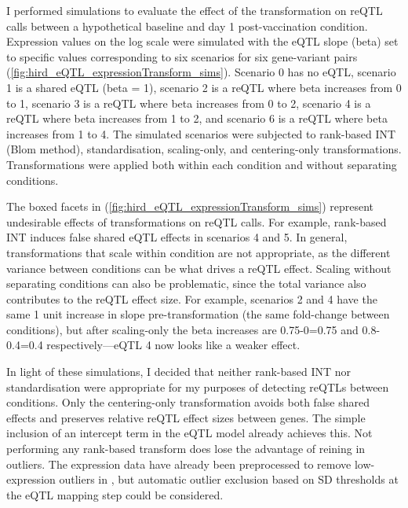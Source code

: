 I performed simulations to evaluate the effect of the transformation on reQTL calls between a hypothetical baseline and day 1 post-vaccination condition.
Expression values on the log scale were simulated with the \gls{eQTL} slope (beta) set to specific values corresponding to six scenarios for six gene-variant pairs (\autoref{fig:hird_eQTL_expressionTransform_sims}).
Scenario 0 has no \gls{eQTL}, 
scenario 1 is a shared eQTL (beta = 1), 
scenario 2 is a \gls{reQTL} where beta increases from 0 to 1,
scenario 3 is a \gls{reQTL} where beta increases from 0 to 2,
scenario 4 is a \gls{reQTL} where beta increases from 1 to 2,
and scenario 6 is a \gls{reQTL} where beta increases from 1 to 4.
The simulated scenarios were subjected to rank-based \gls{INT} (Blom method\autocite{beasley2009RankBasedInverseNormal}), standardisation, scaling-only, and centering-only transformations.
Transformations were applied both within each condition and without separating conditions.

The boxed facets in (\autoref{fig:hird_eQTL_expressionTransform_sims}) represent undesirable effects of transformations on \gls{reQTL} calls.
For example, rank-based \gls{INT} induces false shared \gls{eQTL} effects in scenarios 4 and 5.
In general, transformations that scale within condition are not appropriate, as the different variance between conditions can be what drives a \gls{reQTL} effect.
Scaling without separating conditions can also be problematic, since the total variance also contributes to the \gls{reQTL} effect size.
For example, scenarios 2 and 4 have the same 1 unit increase in slope pre-transformation (the same fold-change between conditions), 
but after scaling-only the beta increases are 0.75-0=0.75 and 0.8-0.4=0.4 respectively---eQTL 4 now looks like a weaker effect.

In light of these simulations, I decided that neither rank-based \gls{INT} nor standardisation were appropriate for my purposes of detecting \glspl{reQTL} between conditions.
Only the centering-only transformation avoids both false shared effects and preserves relative \gls{reQTL} effect sizes between genes.
The simple inclusion of an intercept term in the \gls{eQTL} model already achieves this.
Not performing any rank-based transform does lose the advantage of reining in outliers.
The expression data have already been preprocessed to remove low-expression outliers in , 
but automatic outlier exclusion based on \gls{SD} thresholds at the \gls{eQTL} mapping step could be considered.

